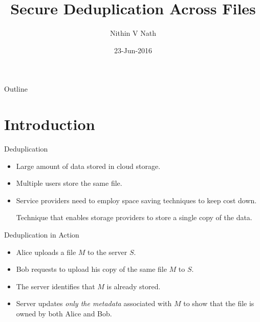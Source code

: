 \documentclass{beamer}
\title{Secure Deduplication Across Files}
\author{Nithin V Nath }
\institute[] %
{
	Advisor: Dr. Bhavana Kanukurthi\\\vspace*{2mm}
	Department of Computer Science and Automation\\
	Indian Institute of Science
}
\date{23-Jun-2016}
\begin{document}
\begin{frame}
  \titlepage
\end{frame}

\begin{frame}{Outline}
  \tableofcontents
\end{frame}

\section{Introduction}

\begin{frame}{Deduplication}{}
  \begin{itemize}
  \setlength\itemsep{1em}
  \item {
    Large amount of data stored in cloud storage.
  }
  \item {
    Multiple users store the same file.
  }
  \item {
    Service providers need to employ space saving techniques to keep cost down.
  }
	\begin{definition}
		Technique that enables storage providers to store a single copy of the data.
	\end{definition}
  \end{itemize}
\end{frame}

\begin{frame}{Deduplication in Action}
  \begin{itemize}
  \setlength\itemsep{1em}
  \item {
    Alice uploads a file $M$ to the server $S$.
  }
  \item {   
	 Bob requests to upload his copy of the same file $M$ to $S$.
  }
  \item The server identifies
	that $M$ is already stored. 
   \item Server updates \textit{only the metadata} associated with $M$ to show
	that the file is owned by both Alice and Bob.
  \end{itemize}
\end{frame}
\end{document}
